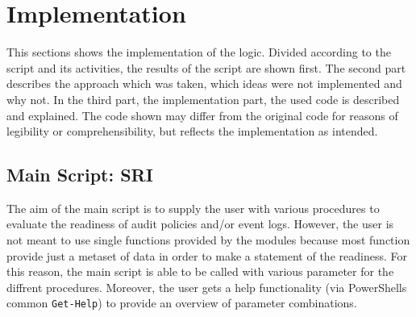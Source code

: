 \section{Implementation}
This sections shows the implementation of the logic. Divided according to the script and its activities, the results of the script are shown first. The second part describes the approach which was taken, which ideas were not implemented and why not. In the third part, the implementation part, the used code is described and explained. The code shown may differ from the original code for reasons of legibility or comprehensibility, but reflects the implementation as intended.


\subsection{Main Script: SRI}
The aim of the main script is to supply the user with various procedures to evaluate the readiness of audit policies and/or event logs. However, the user is not meant to use single functions provided by the modules because most function provide just a metaset of data in order to make a statement of the readiness. For this reason, the main script is able to be called with various parameter for the diffrent procedures. Moreover, the user gets a help functionality (via PowerShells common \lstinline|Get-Help|) to provide an overview of parameter combinations.

